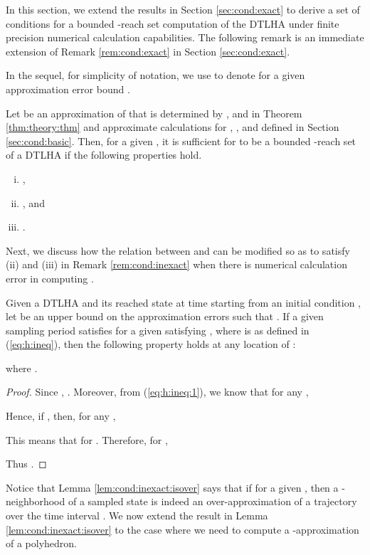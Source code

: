 In this section, we extend the results in Section \ref{sec:cond:exact} to derive a set of conditions for a bounded -reach set computation of the DTLHA under finite precision numerical calculation capabilities.
The following remark is an immediate extension of Remark \ref{rem:cond:exact} in Section \ref{sec:cond:exact}.

In the sequel, for simplicity of notation, we use  to denote  for a given approximation error bound .

\begin{rem} \label{rem:cond:inexact}
Let  be an approximation of  that is determined by , and  in Theorem \ref{thm:theory:thm} and approximate calculations for , , and  defined in Section \ref{sec:cond:basic}.
Then, for a given , it is sufficient for  to be a bounded -reach set of a DTLHA  if the following properties hold.
\begin{enumerate}[(i)]
	\item , 
	\item  , and
	\item .	
\end{enumerate}
\end{rem}


Next, we discuss how the relation between  and  can be modified so as to satisfy (ii) and (iii) in Remark \ref{rem:cond:inexact} when there is numerical calculation error in computing . 


\begin{lem} \label{lem:cond:inexact:isover}
Given a DTLHA  and its reached state  at time  starting from an initial condition , 
let  be an upper bound on the approximation errors such that .
If a given sampling period  satisfies  for a given  satisfying ,  where  is as defined in (\ref{eq:h:ineq}), then the following property holds at any location  of :

where .
\end{lem}
\begin{proof}
Since , .
Moreover, from (\ref{eq:h:ineq:1}), we know that for any ,

Hence, if , then, for any , 
 
This means that  for .
Therefore, for , 

Thus .
\end{proof}


Notice that Lemma \ref{lem:cond:inexact:isover} says that if  for a given , then a -neighborhood of a sampled state is indeed an over-approximation of a trajectory over the time interval .
We now extend the result in Lemma \ref{lem:cond:inexact:isover} to the case where we need to compute a -approximation of a polyhedron.

